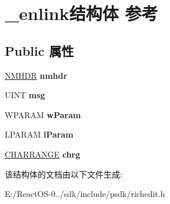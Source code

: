 \hypertarget{struct__enlink}{}\section{\+\_\+enlink结构体 参考}
\label{struct__enlink}
\subsection*{Public 属性}
\begin{DoxyCompactItemize}
\item 
\mbox{\label{struct__enlink_a27e84ea712b71878b24fc6f1db148dfd}} 
\hyperlink{structtag_n_m_h_d_r}{N\+M\+H\+DR} {\bfseries nmhdr}
\item 
\mbox{\label{struct__enlink_a8266ce670af99f08cf49f98ef5e69b6e}} 
U\+I\+NT {\bfseries msg}
\item 
\mbox{\label{struct__enlink_a91d2fe6a9c6cd6b0e5f608c570dddba2}} 
W\+P\+A\+R\+AM {\bfseries w\+Param}
\item 
\mbox{\label{struct__enlink_a7f28e92c29e26055c90cbf24c3156941}} 
L\+P\+A\+R\+AM {\bfseries l\+Param}
\item 
\mbox{\label{struct__enlink_a9b26d46c139c0bbc7261e23f85599247}} 
\hyperlink{struct__charrange}{C\+H\+A\+R\+R\+A\+N\+GE} {\bfseries chrg}
\end{DoxyCompactItemize}


该结构体的文档由以下文件生成\+:\begin{DoxyCompactItemize}
\item 
E\+:/\+React\+O\+S-\/0../sdk/include/psdk/richedit.\+h\end{DoxyCompactItemize}

